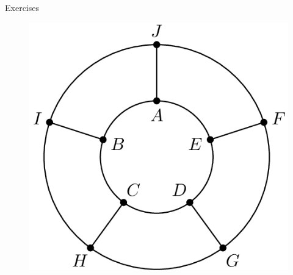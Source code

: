 \begin{xcb}{Exercises}
\begin{enumerate}
\begin{figure}[h]
    \centering
    \includegraphics[width=0.5\linewidth]{Photos/AIME 2018.png}
\end{figure}
\end{enumerate}
\end{xcb}